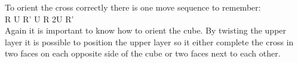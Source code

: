 \begin{figure}[htb]
	\centering
		\hspace{0.02\textwidth}
		\hspace{0.02\textwidth}
		\caption{}
		\label{fig:cross}
\end{figure}

To orient the cross correctly there is one move sequence to remember: \\

R U R' U R 2U R' \\

Again it is important to know how to orient the cube. By twisting the upper layer it is possible to position the upper layer so it either complete the cross in two faces on each opposite side of the cube or two faces next to each other.

